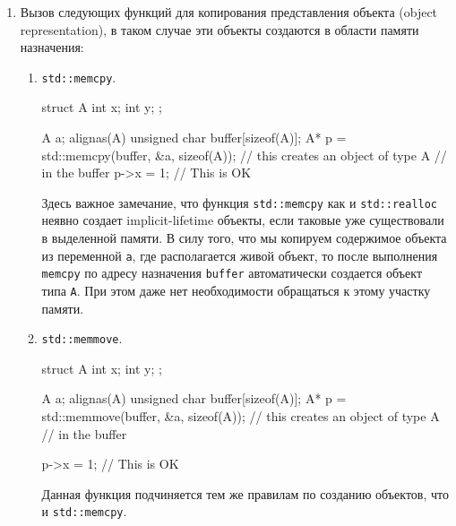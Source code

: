 \documentclass{article}
\begin{document}
\begin{enumerate}
\begin{enumerate}
\item \verb"std::aligned_alloc".
\begin{cppcode}[numbers = none]
void* buffer = std::aligned_alloc(alignof(int), sizeof(int));
int* p = static_cast<int*>(buffer); // because of this line
                                    // std::alighed_alloc creates an int
\end{cppcode}
На практике эта функция нужно только для вызова аллокаций для типов с выравниванием больше $16$ байт (для x64 систем).
На практике для встроенных типов эта функция просто вызывает \verb"std::malloc", хотя это и не гарантируется.
Кроме того у этой функции второй аргумент должен делиться на первый, что дает ограничения, которых нет в \verb"std::malloc".
\end{enumerate}

\item Вызов следующих функций для копирования представления объекта (object representation), в таком случае эти объекты создаются в области памяти назначения:
\begin{enumerate}
\item \verb"std::memcpy".
\begin{cppcode}[numbers = none]
struct A {
  int x;
  int y;
};

A a;
alignas(A) unsigned char buffer[sizeof(A)];
A* p = std::memcpy(buffer, &a, sizeof(A)); // this creates an object of type A
                                           // in the buffer
p->x = 1;                                  // This is OK
\end{cppcode}
Здесь важное замечание, что функция \verb"std::memcpy" как и \verb"std::realloc" неявно создает implicit-lifetime объекты, если таковые уже существовали в выделенной памяти.
В силу того, что мы копируем содержимое объекта из переменной \verb"a", где располагается живой объект, то после выполнения \verb"memcpy" по адресу назначения \verb"buffer" автоматически создается объект типа \verb"A".
При этом даже нет необходимости обращаться к этому участку памяти.

\item \verb"std::memmove".
\begin{cppcode}[numbers = none]
struct A {
  int x;
  int y;
};

A a;
alignas(A) unsigned char buffer[sizeof(A)];
A* p = std::memmove(buffer, &a, sizeof(A)); // this creates an object of type A
                                            // in the buffer

p->x = 1;                                   // This is OK
\end{cppcode}
Данная функция подчиняется тем же правилам по созданию объектов, что и \verb"std::memcpy".


\end{enumerate}
\end{enumerate}
\end{document}
